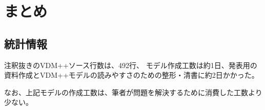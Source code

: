 \section{まとめ}
\subsection{統計情報}
注釈抜きのVDM++ソース行数は、492行、
モデル作成工数は約1日、発表用の資料作成とVDM++モデルの読みやすさのための整形・清書に約2日かかった。

なお、上記モデルの作成工数は、筆者が問題を解決するために消費した工数より少ない。